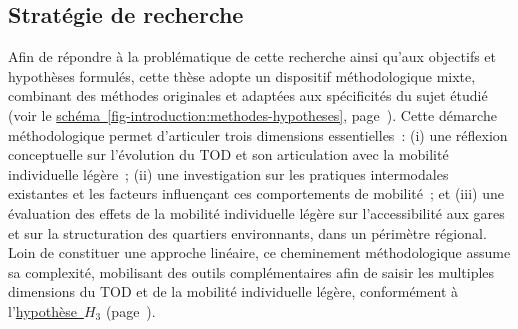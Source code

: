 \begin{refsegment}
\section*{Stratégie de recherche
    \label{introduction-generale:methodologie}
    }

Afin de répondre à la problématique de cette recherche ainsi qu’aux objectifs et hypothèses formulés, cette thèse adopte un dispositif méthodologique mixte, combinant des méthodes originales et adaptées aux spécificités du sujet étudié (voir le \hyperref[fig-introduction:methodes-hypotheses]{schéma~\ref{fig-introduction:methodes-hypotheses}}, page~\pageref{fig-introduction:methodes-hypotheses}). Cette démarche méthodologique permet d’articuler trois dimensions essentielles~: (i) une réflexion conceptuelle sur l’évolution du \acrshort{TOD} et son articulation avec la mobilité individuelle légère~; (ii) une investigation sur les pratiques intermodales existantes et les facteurs influençant ces comportements de mobilité~; et (iii) une évaluation des effets de la mobilité individuelle légère sur l’accessibilité aux gares et sur la structuration des quartiers environnants, dans un périmètre régional. Loin de constituer une approche linéaire, ce cheminement méthodologique assume sa complexité, mobilisant des outils complémentaires afin de saisir les multiples dimensions du \acrshort{TOD} et de la mobilité individuelle légère, conformément à l'\hyperref[hypothese-3]{hypothèse~\(H_3\)} (page~\pageref{hypothese-3}).%


\end{refsegment}
